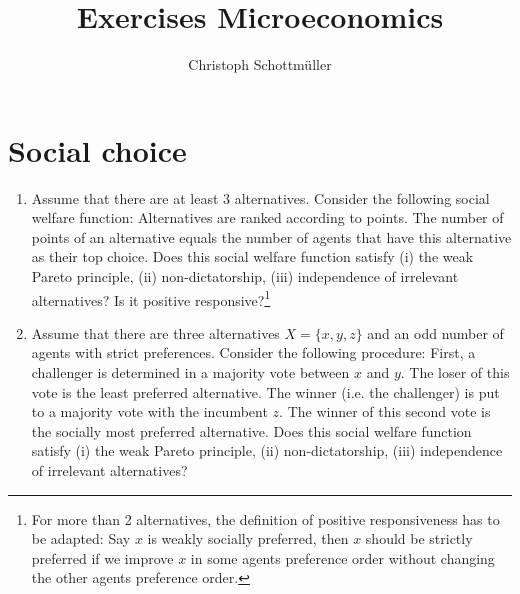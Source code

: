 \documentclass[a4paper,12pt]{article}
\title{Exercises Microeconomics}
\author{Christoph Schottm\"uller}
\date{}
\begin{document}
\maketitle
\section{Social choice}
\label{sec:social-choice}

\begin{enumerate}
\item Assume that there are at least 3 alternatives. Consider the following social welfare function: Alternatives are ranked according to points. The number of points of an alternative equals the number of agents that have this alternative as their top choice. Does this social welfare function satisfy (i) the weak Pareto principle, (ii) non-dictatorship, (iii) independence of irrelevant alternatives? Is it positive responsive?\footnote{For more than 2 alternatives, the definition of positive responsiveness has to be adapted: Say $x$ is weakly socially preferred, then $x$ should be strictly preferred if we improve $x$ in some agents preference order without changing the other agents preference order.}
\item Assume that there are three alternatives $X=\{x,y,z\}$ and an odd number of agents with strict preferences. Consider the following procedure: First, a challenger is determined in a majority vote between $x$ and $y$. The loser of this vote is the least preferred alternative. The winner (i.e. the challenger) is put to a majority vote with the incumbent $z$. The winner of this second vote is the socially most preferred alternative. Does this social welfare function satisfy (i) the weak Pareto principle, (ii) non-dictatorship, (iii) independence of irrelevant alternatives?

\end{enumerate}
\end{document}
